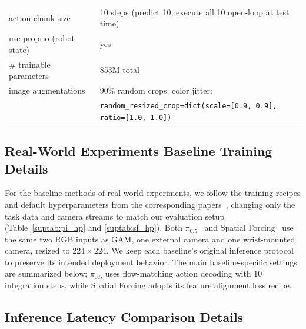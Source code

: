 \documentclass{llmxive}
\providecommand{\xmark}{\ding{55}}
\providecommand{\cmark}{\ding{51}}
\begin{document}
\begin{table}[t]
\begin{minipage}[t]{0.49\linewidth}
{\begin{tabular}{ll}
action chunk size & 10 steps (predict 10, execute all 10 open-loop at test time) \\
use proprio (robot state) & yes \\
\# trainable parameters & 853M total \\
image augmentations & 90\% random crops, color jitter: \\
& \;\; \makecell[l]{\texttt{random\_resized\_crop=dict(scale=[0.9, 0.9],}\\ \texttt{ratio=[1.0, 1.0])}} \\
\bottomrule
\end{tabular}}
\end{minipage}
\end{table}

\subsection{Real-World Experiments Baseline Training Details}
\label{sec:appendix-baseline_training}

For the baseline methods of real-world experiments, we follow the training recipes and default hyperparameters from the corresponding papers~\cite{li2025spatial, pi05}, changing only the task data and camera streams to match our evaluation setup (Table~\ref{suptab:pi_hp} and \ref{suptab:sf_hp}). Both $\pi_{0.5}$~\cite{pi05} and Spatial Forcing~\cite{li2025spatial} use the same two RGB inputs as GAM, one external camera and one wrist-mounted camera, resized to \(224\times224\). We keep each baseline's original inference protocol to preserve its intended deployment behavior. The main baseline-specific settings are summarized below; $\pi_{0.5}$ uses flow-matching action decoding with 10 integration steps, while Spatial Forcing adopts its feature alignment loss recipe.

\subsection{Inference Latency Comparison Details}
\label{sec:appendix-inference_details}


\renewcommand{\cmark}{}
\renewcommand{\xmark}{}
\end{document}
